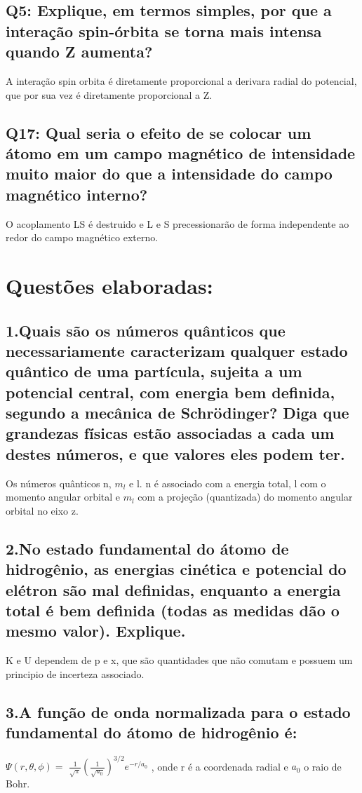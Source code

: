 \documentclass{article}
\begin{document}
\subsection{Q5: Explique, em termos simples, por que a interação spin-órbita se torna mais intensa quando Z aumenta?}

A interação spin orbita é diretamente proporcional a derivara radial do potencial, que por sua vez é diretamente proporcional a Z.

\subsection{Q17: Qual seria o efeito de se colocar um átomo em um campo magnético de intensidade muito maior do que a intensidade do campo magnético interno?
}
O acoplamento LS é destruido e L e S precessionarão de forma independente ao redor do campo magnético externo.
\pagebreak

\section{Questões elaboradas:}
\subsection{1.Quais são os números quânticos que necessariamente caracterizam qualquer estado quântico de uma partícula, sujeita a um potencial central, com energia bem definida, segundo a mecânica de Schrödinger? Diga que grandezas físicas estão associadas a cada um destes números, e que valores eles podem ter.
}
Os números quânticos n, $m_l$ e l. n é associado com a energia total, l com o momento angular orbital e $m_l$ com a projeção (quantizada) do momento angular orbital no eixo z.

\subsection{2.No estado fundamental do átomo de hidrogênio, as energias cinética e potencial do elétron são mal definidas, enquanto a energia total é bem definida (todas as medidas dão o mesmo valor). Explique.
}
K e U dependem de p e x, que são quantidades que não comutam e possuem um principio de incerteza associado.
\subsection{3.A função de onda normalizada para o estado fundamental do átomo de hidrogênio é:
}
$\Psi(r,\theta,\phi) =$
$\frac{1}{\sqrt{\pi}}\left( \frac{1}{\sqrt{a_0}}\right)^{3/2}e^{-r/a_0}$
, onde r é a coordenada radial e $a_0$ o raio de Bohr.
\end{document}
